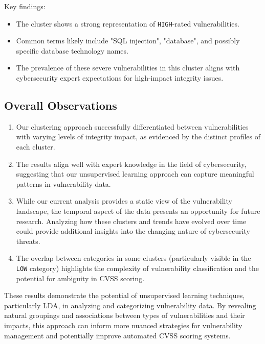 Key findings:
\begin{itemize}
	\item The cluster shows a strong representation of \texttt{HIGH}-rated vulnerabilities.

	\item Common terms likely include "SQL injection", "database", and possibly specific database technology names.

	\item The prevalence of these severe vulnerabilities in this cluster aligns with cybersecurity expert expectations for high-impact integrity issues.

\end{itemize}

\subsection{Overall Observations}

\begin{enumerate}

	\item Our clustering approach successfully differentiated between vulnerabilities with varying
	      levels of integrity impact, as evidenced by the distinct profiles of each cluster.

	\item The results align well with expert knowledge in the field of cybersecurity, suggesting
	      that our unsupervised learning approach can capture meaningful patterns in vulnerability
	      data.

	\item While our current analysis provides a static view of the vulnerability landscape, the
	      temporal aspect of the data presents an opportunity for future research. Analyzing how these
	      clusters and trends have evolved over time could provide additional insights into the
	      changing nature of cybersecurity threats.

	\item The overlap between categories in some clusters (particularly visible in the \texttt{LOW}
	      category) highlights the complexity of vulnerability classification and the potential for
	      ambiguity in CVSS scoring.

\end{enumerate}

These results demonstrate the potential of unsupervised learning techniques, particularly LDA, in
analyzing and categorizing vulnerability data. By revealing natural groupings and associations
between types of vulnerabilities and their impacts, this approach can inform more nuanced strategies
for vulnerability management and potentially improve automated CVSS scoring systems.

